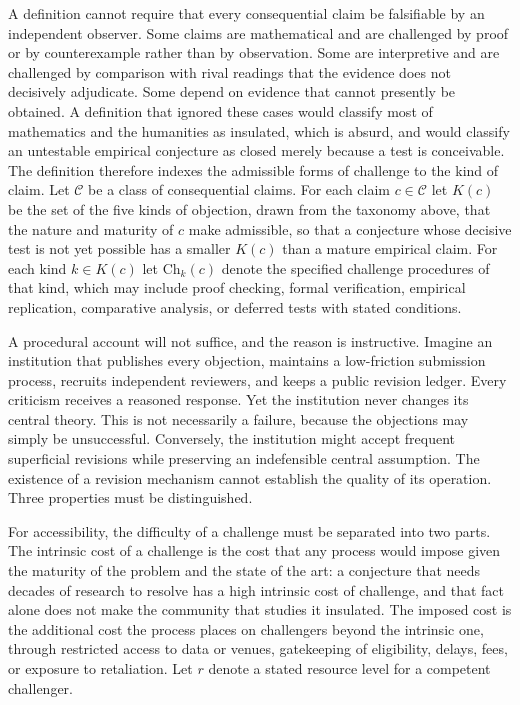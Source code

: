 \documentclass[11pt]{article}
\theoremstyle{remark}
\begin{document}
A definition cannot require that every consequential claim be falsifiable by an independent observer. Some claims are mathematical and are challenged by proof or by counterexample rather than by observation. Some are interpretive and are challenged by comparison with rival readings that the evidence does not decisively adjudicate. Some depend on evidence that cannot presently be obtained. A definition that ignored these cases would classify most of mathematics and the humanities as insulated, which is absurd, and would classify an untestable empirical conjecture as closed merely because a test is conceivable. The definition therefore indexes the admissible forms of challenge to the kind of claim. Let $\mathcal{C}$ be a class of consequential claims. For each claim $c\in\mathcal{C}$ let $K(c)$ be the set of the five kinds of objection, drawn from the taxonomy above, that the nature and maturity of $c$ make admissible, so that a conjecture whose decisive test is not yet possible has a smaller $K(c)$ than a mature empirical claim. For each kind $k\in K(c)$ let $\mathrm{Ch}_k(c)$ denote the specified challenge procedures of that kind, which may include proof checking, formal verification, empirical replication, comparative analysis, or deferred tests with stated conditions.

A procedural account will not suffice, and the reason is instructive. Imagine an institution that publishes every objection, maintains a low-friction submission process, recruits independent reviewers, and keeps a public revision ledger. Every criticism receives a reasoned response. Yet the institution never changes its central theory. This is not necessarily a failure, because the objections may simply be unsuccessful. Conversely, the institution might accept frequent superficial revisions while preserving an indefensible central assumption. The existence of a revision mechanism cannot establish the quality of its operation. Three properties must be distinguished.

For accessibility, the difficulty of a challenge must be separated into two parts. The intrinsic cost of a challenge is the cost that any process would impose given the maturity of the problem and the state of the art: a conjecture that needs decades of research to resolve has a high intrinsic cost of challenge, and that fact alone does not make the community that studies it insulated. The imposed cost is the additional cost the process places on challengers beyond the intrinsic one, through restricted access to data or venues, gatekeeping of eligibility, delays, fees, or exposure to retaliation. Let $r$ denote a stated resource level for a competent challenger.
\end{document}
